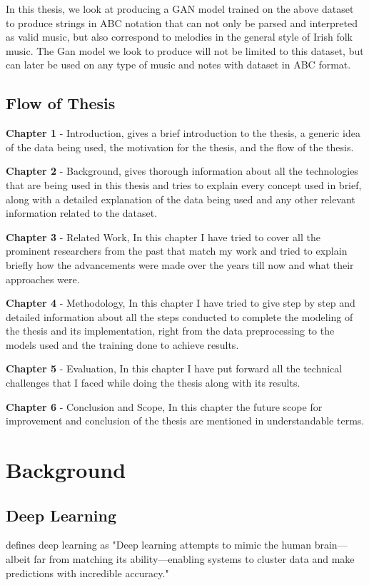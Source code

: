 \documentclass[oneside,12pt]{Classes/RoboticsLaTeX}
\begin{document}
In this thesis, we look at producing a GAN model trained on the above dataset to produce strings in ABC notation that can not only be parsed and interpreted as valid music, but also correspond to melodies in the general style of Irish folk music. The Gan model we look to produce will not be limited to this dataset, but can later be used on any type of music and notes with dataset in ABC format.

\section{Flow of Thesis}
\textbf{Chapter 1} - Introduction, gives a brief introduction to the thesis, a generic idea of the data being used, the motivation for the thesis, and the flow of the thesis.

\noindent
\textbf{Chapter 2} - Background, gives thorough information about all the technologies that are being used in this thesis and tries to explain every concept used in brief, along with a detailed explanation of the data being used and any other relevant information related to the dataset.

\noindent
\textbf{Chapter 3} - Related Work, In this chapter I have tried to cover all the prominent researchers from the past that match my work and tried to explain briefly how the advancements were made over the years till now and what their approaches were.

\noindent
\textbf{Chapter 4} - Methodology, In this chapter I have tried to give step by step and detailed information about all the steps conducted to complete the modeling of the thesis and its implementation, right from the data preprocessing to the models used and the training done to achieve results.

\noindent
\textbf{Chapter 5} - Evaluation, In this chapter I have put forward all the technical challenges that I faced while doing the thesis along with its results.

\noindent
\textbf{Chapter 6} - Conclusion and Scope, In this chapter the future scope for improvement and conclusion of the thesis are mentioned in understandable terms.

\chapter{Background}
\label{chap:backg}

\section{Deep Learning}
\cite{ibm} defines deep learning as "Deep learning attempts to mimic the human brain—albeit far from matching its ability—enabling systems to cluster data and make predictions with incredible accuracy."
\end{document}

